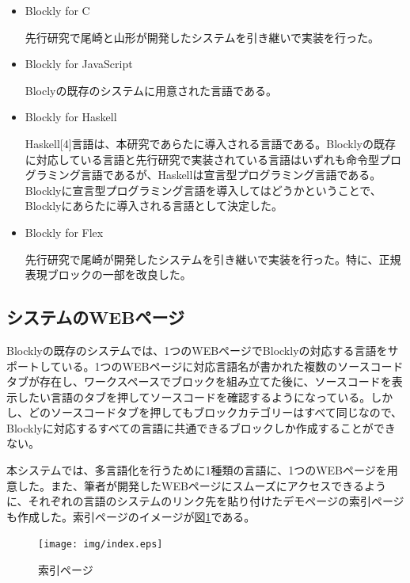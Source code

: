 \documentclass{eniepaper}
\begin{document}
\begin{itemize}
\item Blockly for C

先行研究で尾崎と山形が開発したシステムを引き継いで実装を行った。

\item Blockly for JavaScript

Bloclyの既存のシステムに用意された言語である。

\item Blockly for Haskell

Haskell[4]言語は、本研究であらたに導入される言語である。Blocklyの既存に対応している言語と先行研究で実装されている言語はいずれも命令型プログラミング言語であるが、Haskellは宣言型プログラミング言語である。Blocklyに宣言型プログラミング言語を導入してはどうかということで、Blocklyにあらたに導入される言語として決定した。

\item Blockly for Flex

先行研究で尾崎が開発したシステムを引き継いで実装を行った。特に、正規表現ブロックの一部を改良した。

\end{itemize} 
   
   \subsection{システムのWEBページ}
   
Blocklyの既存のシステムでは、1つのWEBページでBlocklyの対応する言語をサポートしている。1つのWEBページに対応言語名が書かれた複数のソースコードタブが存在し、ワークスペースでブロックを組み立てた後に、ソースコードを表示したい言語のタブを押してソースコードを確認するようになっている。しかし、どのソースコードタブを押してもブロックカテゴリーはすべて同じなので、Blocklyに対応するすべての言語に共通できるブロックしか作成することができない。

本システムでは、多言語化を行うために1種類の言語に、1つのWEBページを用意した。また、筆者が開発したWEBページにスムーズにアクセスできるように、それぞれの言語のシステムのリンク先を貼り付けたデモページの索引ページも作成した。索引ページのイメージが図\ref{fig:index}である。

\begin{figure}[h]
\begin{center}
\texttt{[image: img/index.eps]}
\caption{索引ページ}%
\label{fig:index}
\end{center}%
\end{figure}%
\end{document}
